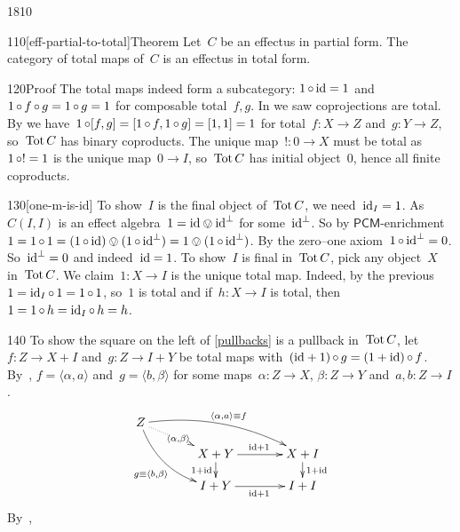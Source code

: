 \begin{parsec}{1810}
\begin{point}{110}[eff-partial-to-total]{Theorem}%
Let~$C$ be an effectus in partial form.
The category of total maps of~$C$ is an effectus in total form.
    \cite[thm.~4.10]{kentapartial}
\begin{point}{120}{Proof}%
The total maps indeed form a subcategory: $1 \mathop{\circ} \mathrm{id} = 1$
    and $1 \mathop{\circ} f \mathop{\circ} g = 1 \mathop{\circ} g = 1$ for composable total~$f,g$.
In  we saw coprojections are total.
By 
    we have~$1 \mathop{\circ} [f,g] = [1 \mathop{\circ} f, 1 \mathop{\circ} g] = [1,1] = 1$
    for total~$f\colon X \to Z$ and~$g\colon Y \to Z$,
    so~$\operatorname{Tot} C$ has binary coproducts.
The unique map~$!\colon 0 \to X$ must be total
    as~$1 \mathop{\circ} ! = 1$ is the unique map~$0 \to I$,
    so~$\operatorname{Tot} C$ has initial object~$0$, hence all finite coproducts.
\end{point}
\begin{point}{130}[one-m-is-id]%
To show~$I$ is the final object of~$\operatorname{Tot} C$,
    we need~$\mathrm{id}_I = 1$.
As~$C(I,I)$ is an effect algebra~$1 = \mathrm{id} \ovee \mathrm{id}^\perp$
    for some~$\mathrm{id}^\perp$.
    So by $\mathsf{PCM}$-enrichment~$1 = 1 \mathop{\circ} 1 = (1 \mathop{\circ} \mathrm{id}) \ovee (1 \mathop{\circ}\mathrm{id}^\perp) = 
1 \ovee (1 \mathop{\circ} \mathrm{id}^\perp)$.
By the zero--one axiom~$1 \mathop{\circ} \mathrm{id}^\perp = 0$.
So~$\mathrm{id}^\perp = 0$ and indeed~$\mathrm{id} = 1$.
To show~$I$ is final in~$\operatorname{Tot} C$, pick any object~$X$ in~$\operatorname{Tot} C$.
We claim~$1 \colon X \to I$ is the unique total map.
Indeed, by the previous $1 = \mathrm{id}_I \mathop{\circ} 1 = 1 \mathop{\circ} 1$, so~$1$ is total
and if~$h\colon X \to I$ is total, then~$1=1 \mathop{\circ} h = \mathrm{id}_I \mathop{\circ} h = h$.
\end{point}
\begin{point}{140}%
To show the square on the left of \eqref{pullbacks} is a pullback
    in~$\operatorname{Tot} C$,
let~$f\colon Z \to X+I$ 
and~$g\colon Z \to I+Y$ be total maps
    with~$(\mathrm{id}+1) \mathop{\circ} g = (1+\mathrm{id}) \mathop{\circ} f$.
By~, $f = \langle \alpha, a \rangle$
    and~$g = \langle b, \beta \rangle$
    for some maps~$\alpha\colon Z \to X$, $\beta\colon Z \to Y$
        and~$a,b\colon Z \to I$.
\begin{equation*}
\xymatrix@C+1pc@R-1pc{ 
Z \ar@/^1pc/[rrd]^{\langle\alpha,a \rangle \equiv f}
    \ar@/_1pc/[rdd]_{g \equiv \langle b, \beta\rangle}
    \ar@{.>}[rd]|{\langle \alpha, \beta\rangle}
    \\
    &  X+Y \ar[r]^{\id+1} \ar[d]_{1+\id} & X+I\ar[d]^{1+\id} \\
    &I+Y\ar[r]_{\id+1} & I+I
    }
\end{equation*}
By~,

\end{point}
\end{point}
\end{parsec}
